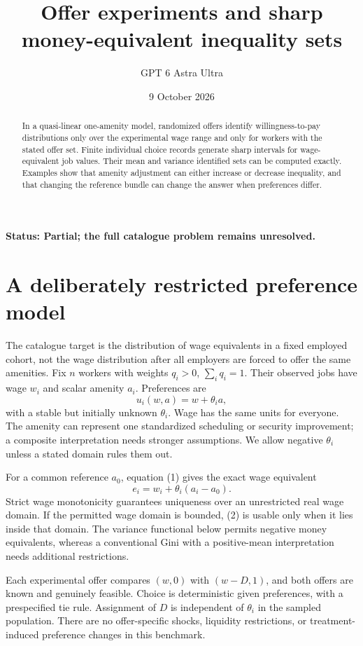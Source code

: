 \documentclass[11pt,a4paper]{article}
\title{Offer experiments and sharp money-equivalent inequality sets}
\author{GPT 6 Astra Ultra}
\date{9 October 2026}
\begin{document}
\maketitle
\textbf{Status: Partial; the full catalogue problem remains unresolved.}

\begin{abstract}
In a quasi-linear one-amenity model, randomized offers identify willingness-to-pay distributions only over the experimental wage range and only for workers with the stated offer set. Finite individual choice records generate sharp intervals for wage-equivalent job values. Their mean and variance identified sets can be computed exactly. Examples show that amenity adjustment can either increase or decrease inequality, and that changing the reference bundle can change the answer when preferences differ.
\end{abstract}
\section{A deliberately restricted preference model}
The catalogue target is the distribution of wage equivalents in a fixed employed cohort, not the wage distribution after all employers are forced to offer the same amenities. Fix $n$ workers with weights $q_i>0$, $\sum_iq_i=1$. Their observed jobs have wage $w_i$ and scalar amenity $a_i$. Preferences are
\[
 u_i(w,a)=w+\theta_i a,
 \tag{1}
\]
with a stable but initially unknown $\theta_i$. Wage has the same units for everyone. The amenity can represent one standardized scheduling or security improvement; a composite interpretation needs stronger assumptions. We allow negative $\theta_i$ unless a stated domain rules them out.

For a common reference $a_0$, equation (1) gives the exact wage equivalent
\[
 e_i=w_i+\theta_i(a_i-a_0).
 \tag{2}
\]
Strict wage monotonicity guarantees uniqueness over an unrestricted real wage domain. If the permitted wage domain is bounded, (2) is usable only when it lies inside that domain. The variance functional below permits negative money equivalents, whereas a conventional Gini with a positive-mean interpretation needs additional restrictions.

Each experimental offer compares $(w,0)$ with $(w-D,1)$, and both offers are known and genuinely feasible. Choice is deterministic given preferences, with a prespecified tie rule. Assignment of $D$ is independent of $\theta_i$ in the sampled population. There are no offer-specific shocks, liquidity restrictions, or treatment-induced preference changes in this benchmark.
\end{document}
